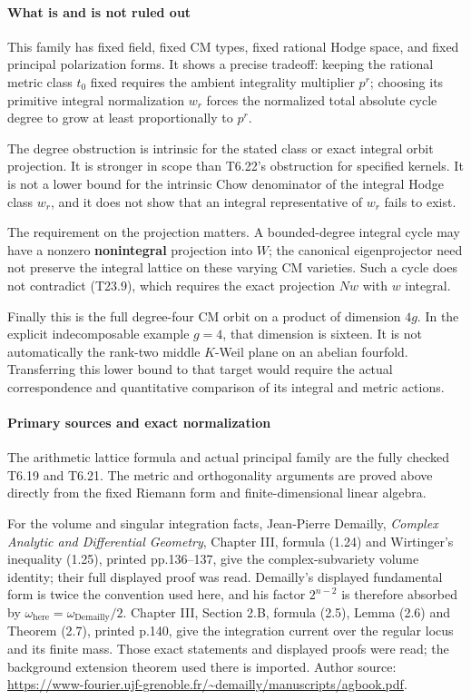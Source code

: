 \paragraph{What is and is not ruled out}\label{what-is-and-is-not-ruled-out}

This family has fixed field, fixed CM types, fixed rational Hodge space, and fixed principal polarization forms. It shows a precise tradeoff: keeping the rational metric class \(t_0\) fixed requires the ambient integrality multiplier \(p^r\); choosing its primitive integral normalization \(w_r\) forces the normalized total absolute cycle degree to grow at least proportionally to \(p^r\).

The degree obstruction is intrinsic for the stated class or exact integral orbit projection. It is stronger in scope than T6.22's obstruction for specified kernels. It is not a lower bound for the intrinsic Chow denominator of the integral Hodge class \(w_r\), and it does not show that an integral representative of \(w_r\) fails to exist.

The requirement on the projection matters. A bounded-degree integral cycle may have a nonzero \textbf{nonintegral} projection into \(W\); the canonical eigenprojector need not preserve the integral lattice on these varying CM varieties. Such a cycle does not contradict (T23.9), which requires the exact projection \(Nw\) with \(w\) integral.

Finally this is the full degree-four CM orbit on a product of dimension \(4g\). In the explicit indecomposable example \(g=4\), that dimension is sixteen. It is not automatically the rank-two middle \(K\)-Weil plane on an abelian fourfold. Transferring this lower bound to that target would require the actual correspondence and quantitative comparison of its integral and metric actions.

\paragraph{Primary sources and exact normalization}\label{primary-sources-and-exact-normalization}

The arithmetic lattice formula and actual principal family are the fully checked T6.19 and T6.21. The metric and orthogonality arguments are proved above directly from the fixed Riemann form and finite-dimensional linear algebra.

For the volume and singular integration facts, Jean-Pierre Demailly, \emph{Complex Analytic and Differential Geometry}, Chapter III, formula (1.24) and Wirtinger's inequality (1.25), printed pp.136--137, give the complex-subvariety volume identity; their full displayed proof was read. Demailly's displayed fundamental form is twice the convention used here, and his factor \(2^{n-2}\) is therefore absorbed by \(\omega_{\mathrm{here}}=\omega_{\mathrm{Demailly}}/2\). Chapter III, Section 2.B, formula (2.5), Lemma (2.6) and Theorem (2.7), printed p.140, give the integration current over the regular locus and its finite mass. Those exact statements and displayed proofs were read; the background extension theorem used there is imported. Author source: \url{https://www-fourier.ujf-grenoble.fr/~demailly/manuscripts/agbook.pdf}.

